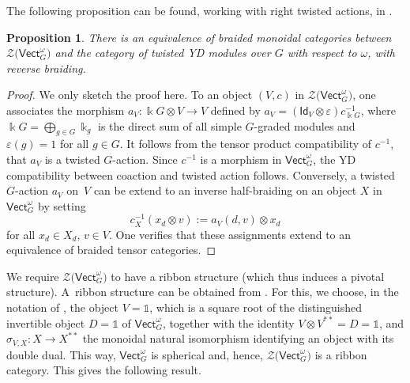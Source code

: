 \documentclass[10pt,a4paper]{amsart}
\numberwithin{equation}{section}
\newtheorem{Proposition}[Theorem]{Proposition}
 { \theoremstyle{definition}
\newtheorem{Definition}[Theorem]{Definition}
\newtheorem{Note}[Theorem]{Note}
\newtheorem{Notation}[Theorem]{Notation}
\newtheorem{Example}[Theorem]{Example}
\newtheorem{Remark}[Theorem]{Remark} }
\newcommand{\ide}{\mathsf{Id}}
\newcommand{\one}{\mathds{1}}
\newcommand{\Vect}{\mathsf{Vect}}
\newcommand{\cZ}{\mathcal{Z}}
\begin{document}
The following proposition can be found, working with right twisted actions, in \cite[Section~3]{Maj98}.
\begin{Proposition}\label{prop:twistedYD-ZVect}
There is an equivalence of braided monoidal categories between $\cZ\big(\Vect_G^\omega\big)$ and the category of twisted YD modules over $G$ with respect to $\omega$, with reverse braiding.
\end{Proposition}
\begin{proof}
We only sketch the proof here. To an object $(V,c)$ in $\cZ\big(\Vect_G^\omega\big)$, one associates the morphism $a_V\colon \Bbbk G\otimes V\to V$ defined by $a_V=(\ide_V\otimes \varepsilon)c^{-1}_{\Bbbk G}$, where $\Bbbk G=\bigoplus_{g\in G} \Bbbk_g$ is the direct sum of all simple $G$-graded modules and $\varepsilon(g)=1$ for all $g\in G$. It follows from the tensor product compatibility of $c^{-1}$, that $a_V$ is a twisted $G$-action. Since $c^{-1}$ is a morphism in $\Vect_G^\omega$, the YD compatibility between coaction and twisted action follows. Conversely, a twisted $G$-action $a_V$ on~$V$ can be extend to an inverse half-braiding on an object $X$ in $\Vect_G^\omega$ by setting
\[c^{-1}_X(x_d\otimes v):=a_V(d,v)\otimes x_d \]
for all $x_d\in X_d$, $v\in V$. One verifies that these assignments extend to an equivalence of braided tensor categories.
\end{proof}

We require $\cZ\big(\Vect_G^\omega\big)$ to have a ribbon structure (which thus induces a pivotal structure). A~ribbon structure can be obtained from \cite[Theorem~5.4]{Shi2}. For this, we choose, in the notation of \cite[Section~3.2]{LW2}, the object $V=\one$, which is a square root of the distinguished invertible object $D=\one$ of $\Vect_G^\omega$, together with the identity $V\otimes V^{**}=D=\one$, and $\sigma_{V,X}\colon X\to X^{**}$ the monoidal natural isomorphism identifying an object with its double dual. This way, $\Vect_G^\omega$ is spherical and, hence, $\cZ\big(\Vect_G^\omega\big)$ is a ribbon category. This gives the following result.
\end{document}
